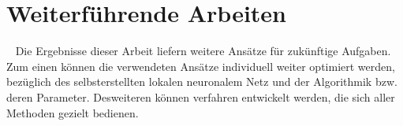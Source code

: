 \section{Weiterführende Arbeiten}~\newline 
Die Ergebnisse dieser Arbeit liefern weitere Ansätze für zukünftige Aufgaben. Zum einen können die verwendeten Ansätze individuell weiter optimiert werden, bezüglich des selbsterstellten lokalen neuronalem Netz und der Algorithmik bzw. deren Parameter. Desweiteren können verfahren entwickelt werden, die sich aller Methoden gezielt bedienen. 
